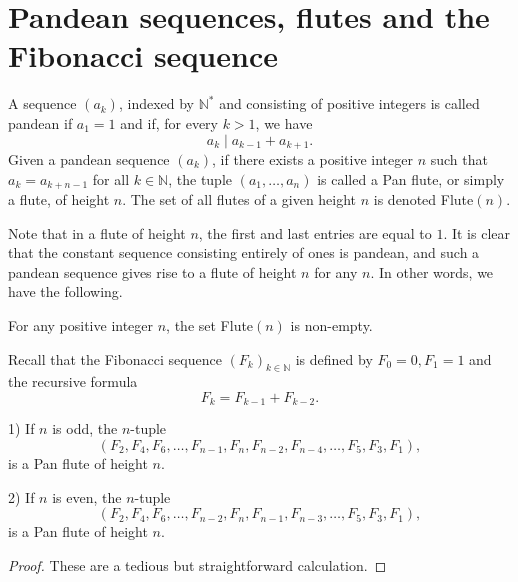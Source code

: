 
\chapter{Pandean sequences, flutes and the Fibonacci sequence}
\begin{definition}
    \label{def:flute}
    A sequence $(a_k)$, indexed by $\mathbb{N}^*$ and consisting of positive integers is called pandean if $a_1 = 1$ and 
    if, for every $k > 1$, we have
    \[
        a_k \mid a_{k-1} + a_{k+1}.
    \]
    Given a pandean sequence $(a_k)$, if there exists a positive integer $n$ such that $a_k = a_{k+n-1}$ for all $k\in \mathbb{N}$, 
    the tuple $(a_1, \ldots, a_n)$ is called a Pan flute, or simply a flute, of height $n$. The set of all flutes of a given height $n$ 
    is denoted Flute$(n)$.
\end{definition}
Note that in a flute of height $n$, the first and last entries are equal to $1$. It is clear that the constant sequence consisting 
entirely of ones is pandean, and such a pandean sequence gives rise to a flute of height $n$ for any $n$.
In other words, we have the following.
\begin{lemma}
    \label{l:nFluteNonEmpty}
    For any positive integer $n$, the set Flute$(n)$ is non-empty.
\end{lemma}
Recall that the Fibonacci sequence $(F_k)_{k \in \mathbb{N}}$ is defined by $F_0 = 0, F_1 = 1$ and the recursive formula
    \[
        F_k = F_{k-1} + F_{k-2}.
    \]


\begin{lemma}
    \label{l:FibFlute}
    1) If $n$ is odd, the $n$-tuple 
    \[
        (F_2,F_4, F_6, \ldots, F_{n-1}, F_{n}, F_{n-2}, F_{n-4}, \ldots, F_5, F_3, F_1), 
    \]
    is a Pan flute of height $n$.

    2) If $n$ is even, the $n$-tuple 
    \[
        (F_2, F_4, F_6, \ldots, F_{n-2}, F_{n}, F_{n-1}, F_{n-3}, \ldots, F_5, F_3,F_1),
    \]
    is a Pan flute of height $n$. 
\end{lemma}
\begin{proof}
    These are a tedious but straightforward calculation.
\end{proof}

